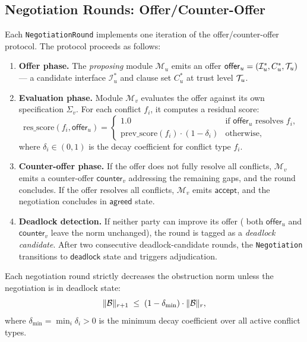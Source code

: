\documentclass[11pt]{article}
\newcommand{\Mod}{\mathcal{M}}            %
\newcommand{\Iface}{\mathcal{I}}          %
\newcommand{\ModSpec}[1]{\Sigma_{#1}}     %
\newcommand{\offer}{\mathsf{offer}}       %
\newcommand{\counter}{\mathsf{counter}}   %
\newcommand{\accept}{\mathsf{accept}}     %
\newcommand{\deadlock}{\mathsf{deadlock}} %
\newcommand{\norm}[1]{\lVert #1 \rVert}  %
\newcommand{\ObsNorm}{\norm{\obstr}}      %
\begin{document}
\subsection{Negotiation Rounds: Offer/Counter-Offer}

Each \texttt{NegotiationRound} implements one iteration of the
offer/counter-offer protocol.  The protocol proceeds as follows:

\begin{enumerate}[leftmargin=*,noitemsep]
  \item \textbf{Offer phase.} The \emph{proposing} module $\Mod_u$
    emits an offer $\offer_u = (\Iface_u^*, C_u^*, \trust_u)$ —
    a candidate interface $\Iface_u^*$ and clause set $C_u^*$
    at trust level $\mathcal{T}_u$.

  \item \textbf{Evaluation phase.} Module $\Mod_v$ evaluates the
    offer against its own specification $\ModSpec{v}$.  For each
    conflict $f_i$, it computes a residual score:
    \[
      \mathrm{res\_score}(f_i, \offer_u) =
      \begin{cases}
        1.0 & \text{if } \offer_u \text{ resolves } f_i, \\
        \mathrm{prev\_score}(f_i) \cdot (1 - \delta_i) & \text{otherwise,}
      \end{cases}
    \]
    where $\delta_i \in (0,1)$ is the decay coefficient for conflict
    type $f_i$.

  \item \textbf{Counter-offer phase.} If the offer does not fully
    resolve all conflicts, $\Mod_v$ emits a counter-offer
    $\counter_v$ addressing the remaining gaps, and the round
    concludes.  If the offer resolves all conflicts, $\Mod_v$
    emits $\accept$, and the negotiation concludes in
    $\mathsf{agreed}$ state.

  \item \textbf{Deadlock detection.} If neither party can improve its
    offer (\ie{} both $\offer_u$ and $\counter_v$ leave the norm
    unchanged), the round is tagged as a \emph{deadlock candidate}.
    After two consecutive deadlock-candidate rounds, the
    \texttt{Negotiation} transitions to $\deadlock$ state and
    triggers adjudication.
\end{enumerate}

\begin{lemma}\label{lem:norm-mono}
Each negotiation round strictly decreases the obstruction norm unless
the negotiation is in deadlock state:
\[
  \ObsNorm_{r+1} \;\leq\; (1 - \delta_{\min}) \cdot \ObsNorm_r,
\]
where $\delta_{\min} = \min_i \delta_i > 0$ is the minimum decay
coefficient over all active conflict types.
\end{lemma}
\end{document}
